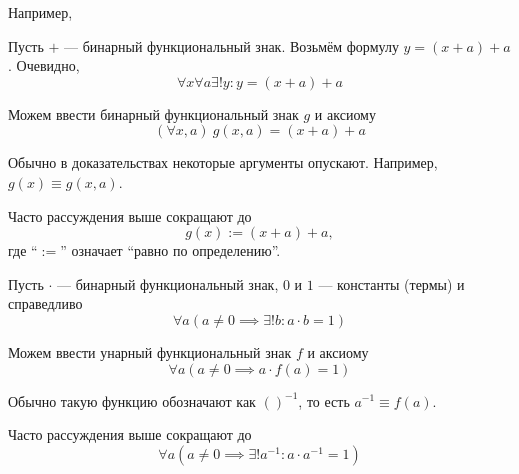\begin{fullwidth}
	Например,
	\begin{multicols}{2}
		\raggedcolumns

		Пусть $+$ --- бинарный функциональный знак.
		Возьмём формулу $y=(x+a)+a$. Очевидно,
		\[
			\forall x\forall a\exists !y:y=(x+a)+a
		\]

		Можем ввести бинарный функциональный знак $g$ и аксиому
		\[
			(\forall x,a)~g(x,a)=(x+a)+a
		\]

		Обычно в доказательствах некоторые аргументы опускают.
		Например, $g(x)\equiv g(x,a)$.

		Часто рассуждения выше сокращают до
		\[
			g(x):=(x+a)+a,
		\]
		где ``$:=$'' означает ``равно по определению''.

		\columnbreak

		Пусть $\cdot$ --- бинарный функциональный знак,
		$0$ и $1$ --- константы (термы) и справедливо
		\[
			\forall a(a\neq 0\implies \exists !b:a\cdot b=1)
		\]

		Можем ввести унарный функциональный знак $f$ и аксиому
		\[
			\forall a(a\neq 0\implies a\cdot f(a)=1)
		\]

		Обычно такую функцию обозначают как $()^{-1}$, то есть $a^{-1}\equiv f(a)$.

		Часто рассуждения выше сокращают до
		\[
			\forall a(a\neq 0\implies \exists !a^{-1}:a\cdot a^{-1}=1)
		\]
	\end{multicols}
\end{fullwidth}

\pagebreak
